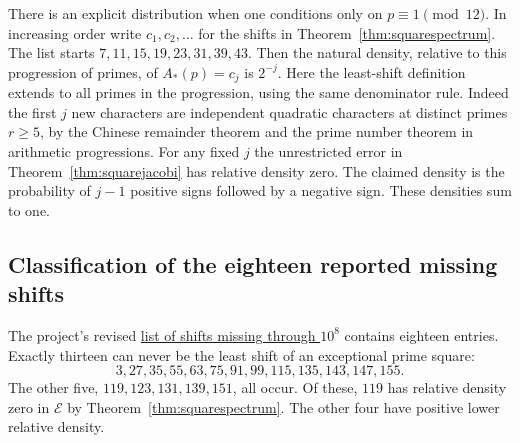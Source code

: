 \documentclass[a4paper,11pt]{article}
\theoremstyle{definition}\newtheorem{question}[theorem]{Question}
\newcommand{\E}{\mathcal E}
\begin{document}
There is an explicit distribution when one conditions only on
$p\equiv1\pmod{12}$. In increasing order write $c_1,c_2,\ldots$
for the shifts in Theorem~\ref{thm:squarespectrum}. The list starts $7,11,15,19,23,31,39,43$. Then the natural
density, relative to this progression of primes, of $A_*(p)=c_j$
is $2^{-j}$. Here the least-shift definition extends to all primes
in the progression, using the same denominator rule. Indeed the first
$j$ new characters are independent quadratic characters at distinct
primes $r\ge5$, by the Chinese remainder theorem and the prime number
theorem in arithmetic progressions. For any fixed $j$ the unrestricted
error in Theorem~\ref{thm:squarejacobi} has relative density zero.
The claimed density is the probability of $j-1$ positive signs followed
by a negative sign. These densities sum to one.


\subsection{Classification of the eighteen reported missing shifts}
\label{sec:missing-shifts}
The project's revised \href{https://github.com/GUINEA-PIG-TRENCH/erdos-straus-solver/blob/b6e0ae6d7885c84082e5c654a3b9bdfbe02bd307/CONJECTURE.md\#L172}{list of shifts missing through $10^8$} contains eighteen entries. Exactly thirteen can never be the least shift of an exceptional prime square:
\[
 3,27,35,55,63,75,91,99,115,135,143,147,155.
\]
The other five, $119,123,131,139,151$, all occur. Of these, $119$ has relative density zero in $\E$ by Theorem~\ref{thm:squarespectrum}. The other four have positive lower relative density.
\end{document}
